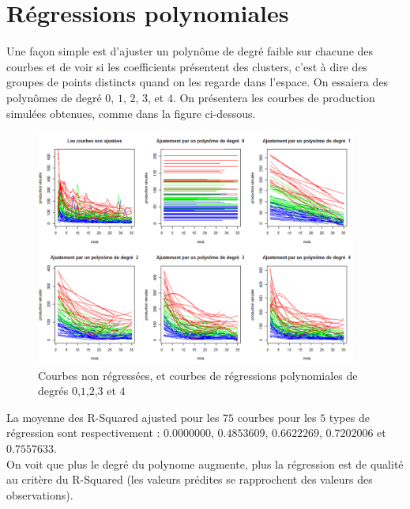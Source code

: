 \documentclass[12pt]{article}
\begin{document}
\small{
\tableofcontents 
}


\newpage


\section{R\'egressions polynomiales}
\label{sec:reg_pol}

Une fa\c con simple est d'ajuster un polyn\^ome de degr\'e faible sur chacune des courbes et
de voir si les coefficients pr\'esentent des clusters, c'est \`a dire des groupes de points distincts
quand on les regarde dans l'espace.
On essaiera des polyn\^omes de degr\'e $0$, $1$, $2$, $3$, et $4$.
On pr\'esentera les courbes de production simul\'ees obtenues, comme dans la figure ci-dessous.
 
\begin{figure}[H]
 \centering %
	\includegraphics[width=400px]{reg_pol}
  \caption{\label{fig:polynomial_regressions} Courbes non r\'egress\'ees, et courbes de r\'egressions polynomiales de degr\'es $0$,$1$,$2$,$3$ et $4$}
\end{figure}

La moyenne des R-Squared ajusted pour les $75$ courbes pour les $5$ types de r\'egression sont respectivement : 
\newline
$0.0000000$, $0.4853609$, $0.6622269$, $0.7202006$ et $0.7557633$.
\newline
~\\
On voit que plus le degr\'e du polynome augmente, plus la r\'egression est de qualit\'e au crit\`ere du R-Squared (les valeurs pr\'edites se rapprochent des valeurs des observations).
\end{document}
